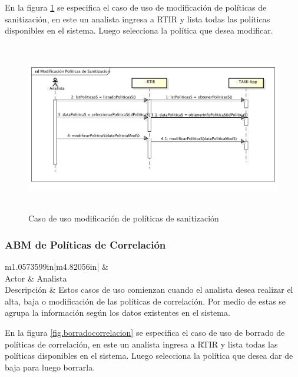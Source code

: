 \bigskip
\bigskip
En la figura \ref{fig.modificacionsanitizacion} se especifica el caso de uso de modificación de políticas de sanitización, en este un analista ingresa a
RTIR y lista todas las políticas disponibles en el sistema. Luego selecciona la política que desea modificar.

\begin{figure}[H]
	\centering
	\includegraphics[width=5.7638in,height=2.9256in]{Analisis22-img/Analisis22-img019.png} 
	\caption{Caso de uso modificación de políticas de sanitización}
	\label{fig.modificacionsanitizacion}
\end{figure}

\subsubsection{ABM de Políticas de Correlación}
\begin{flushleft}
	\tablefirsthead{}
	\tablehead{}
	\tabletail{}
	\tablelasttail{}
	\begin{supertabular}{m{1.0573599in}|m{4.82056in}|}
		 &
		\\\hline
		{Actor} &
		{Analista}\\
		{Descripción} &
		{Estos casos de uso comienzan cuando el analista desea realizar el alta, baja o
			modificación de las políticas de correlación. Por medio de estas se agrupa la información según los datos existentes en
			el sistema.}\\\hhline{~-}
	\end{supertabular}
\end{flushleft}

\bigskip
	En la figura \ref{fig.borradocorrelacion} se especifica el caso de uso de borrado de políticas de correlación, en este un analista ingresa a RTIR y
	lista todas las políticas disponibles en el sistema. Luego selecciona la política que desea dar de baja para luego
	borrarla.
	
